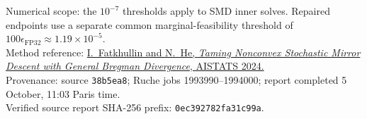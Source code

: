 \documentclass[11pt,a4paper]{article}
\begin{document}
\vfill
{\fontsize{10}{11}\selectfont
Numerical scope: the $10^{-7}$ thresholds apply to SMD inner solves. Repaired endpoints use a separate common marginal-feasibility threshold of $100\epsilon_{\mathrm{FP32}}\approx1.19\times10^{-5}$.\\
Method reference: \href{https://proceedings.mlr.press/v238/fatkhullin24a.html}{I.~Fatkhullin and N.~He, \emph{Taming Nonconvex Stochastic Mirror Descent with General Bregman Divergence}, AISTATS 2024.}\\
Provenance: source \texttt{38b5ea8}; Ruche jobs 1993990--1994000; report completed 5 October, 11:03 Paris time.\\
Verified source report SHA-256 prefix: \texttt{0ec392782fa31c99a}.
}
\end{document}
